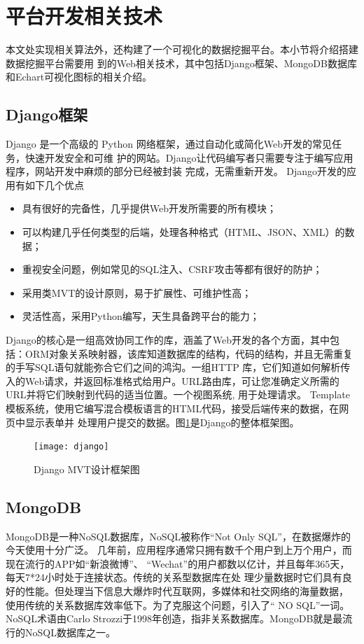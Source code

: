 \section{平台开发相关技术}
本文处实现相关算法外，还构建了一个可视化的数据挖掘平台。本小节将介绍搭建数据挖掘平台需要用
到的Web相关技术，其中包括Django框架、MongoDB数据库和Echart可视化图标的相关介绍。
\subsection{Django框架}
Django 是一个高级的 Python 网络框架，通过自动化或简化Web开发的常见任务，快速开发安全和可维
护的网站。Django让代码编写者只需要专注于编写应用程序，网站开发中麻烦的部分已经被封装
完成，无需重新开发。
 Django开发的应用有如下几个优点
\begin{itemize}
\item 具有很好的完备性，几乎提供Web开发所需要的所有模块；
\item 可以构建几乎任何类型的后端，处理各种格式（HTML、JSON、XML）的数据；
\item 重视安全问题，例如常见的SQL注入、CSRF攻击等都有很好的防护；
\item 采用类MVT的设计原则，易于扩展性、可维护性高；
\item 灵活性高，采用Python编写，天生具备跨平台的能力；
\end{itemize}

Django的核心是一组高效协同工作的库，涵盖了Web开发的各个方面，其中包括：ORM对象关系映射器，该库知道数据库的结构，代码的结构，并且无需重复的手写SQL语句就能弥合它们之间的鸿沟。一组HTTP
库，它们知道如何解析传入的Web请求，并返回标准格式给用户。URL路由库，可让您准确定义所需的
URL并将它们映射到代码的适当位置。一个视图系统, 用于处理请求。 
Template模板系统，使用它编写混合模板语言的HTML代码，接受后端传来的数据，在网页中显示表单并
处理用户提交的数据。图\ref{fig:django}是Django的整体框架图。

\begin{figure}
  \centering
  \texttt{[image: django]}
  \caption{Django MVT设计框架图\cite{mozilla.org}}
  \label{fig:django}
\end{figure}

\subsection{MongoDB}
MongoDB是一种NoSQL数据库，NoSQL被称作“Not Only SQL”，在数据爆炸的今天使用十分广泛。
几年前，应用程序通常只拥有数千个用户到上万个用户，而现在流行的APP如“新浪微博”、
“Wechat”的用户都数以亿计，并且每年365天，每天7*24小时处于连接状态。传统的关系型数据库在处
理少量数据时它们具有良好的性能。但处理当下信息大爆炸时代互联网，多媒体和社交网络的海量数据，
使用传统的关系数据库效率低下。为了克服这个问题，引入了“ NO SQL”一词。 NoSQL术语由Carlo
Strozzi于1998年创造，指非关系数据库。MongoDB就是最流行的NoSQL数据库之一。

